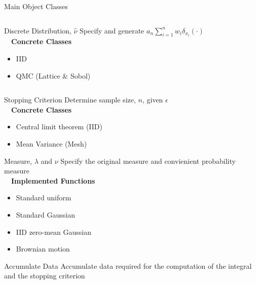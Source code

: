 \documentclass[final]{beamer}
\newlength{\onecolwid}
\newlength{\twocolwid}
\newlength{\threecolwid}
\begin{document}
\begin{frame}[t]
\begin{columns}[t]
\begin{column}{\threecolwid}
\begin{columns}[t,totalwidth=\threecolwid]
\begin{column}{\twocolwid}
\begin{block}{Main Object Classes}
\begin{column}{\onecolwid}
\vspace{-.1in}
\begin{alertblock}{Discrete Distribution, $\hat{\nu}$}
    Specify and generate $a_n \sum_{i=1}^n w_i \delta_{x_i}(\cdot)$ \\[1ex]~\
    \textbf{Concrete Classes}
    \begin{itemize}
        \item IID
        \item QMC (Lattice \& Sobol) \cite{kuo2016application,nuyensmagic}
    \end{itemize}
\end{alertblock}
\end{column} 
\begin{column}{\onecolwid}   \vspace{-2ex}
\begin{alertblock}{Stopping Criterion}
    Determine sample size, $n$, given $\epsilon$\\[1ex]~\
    \textbf{Concrete Classes}
    \begin{itemize}
        \item Central limit theorem (IID)
        \item Mean Variance (Mesh)
    \end{itemize}
\end{alertblock}

\vspace{.4in}
\begin{alertblock}{Measure, $\lambda$ and $\nu$}
    Specify the original measure and convienient probability measure \\[1ex]~\
    \textbf{Implemented Functions}
    \begin{itemize}
        \item Standard uniform
        \item Standard Gaussian
        \item IID zero-mean Gaussian
        \item Brownian motion 
    \end{itemize}
\end{alertblock}

\vspace{.4in}
\begin{alertblock}{Accumulate Data}
    Accumulate data required for the computation of the integral and the stopping criterion
\end{alertblock}
\end{column}


\end{block}
\end{column}
\end{columns}
\end{column}
\end{columns}
\end{frame}
\end{document}
